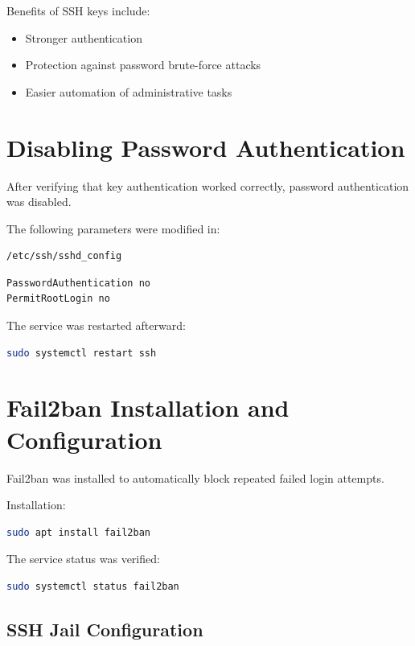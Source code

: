 \documentclass[11pt,a4paper]{article}
\begin{document}
Benefits of SSH keys include:
\begin{itemize}
    \item Stronger authentication
    \item Protection against password brute-force attacks
    \item Easier automation of administrative tasks
\end{itemize}

\section{Disabling Password Authentication}

After verifying that key authentication worked correctly, password authentication was disabled.

The following parameters were modified in:

\begin{lstlisting}
/etc/ssh/sshd_config
\end{lstlisting}

\begin{lstlisting}
PasswordAuthentication no
PermitRootLogin no
\end{lstlisting}

The service was restarted afterward:

\begin{lstlisting}[language=bash]
sudo systemctl restart ssh
\end{lstlisting}

\section{Fail2ban Installation and Configuration}

Fail2ban was installed to automatically block repeated failed login attempts.

Installation:

\begin{lstlisting}[language=bash]
sudo apt install fail2ban
\end{lstlisting}

The service status was verified:

\begin{lstlisting}[language=bash]
sudo systemctl status fail2ban
\end{lstlisting}

\subsection{SSH Jail Configuration}
\end{document}
